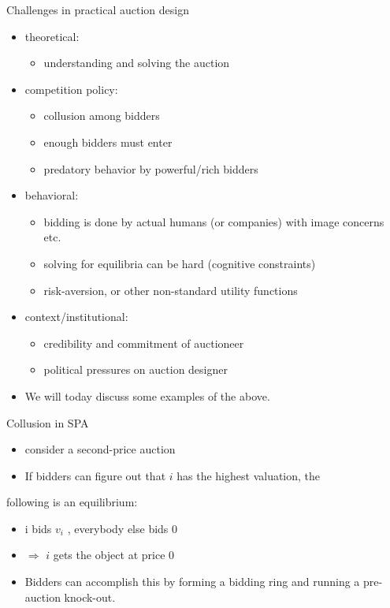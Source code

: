 \documentclass[bigger]{beamer}
\newcommand{\Ra}{\Rightarrow} \newcommand{\ra}{\rightarrow} \newcommand{\Lra}{\Leftrightarrow}
\begin{document}
\begin{frame}[label={sec:org34663bd}]{Challenges in practical auction design}
\begin{itemize}
\item theoretical:
\begin{itemize}
\item understanding and solving the auction
\end{itemize}
\item competition policy:
\begin{itemize}
\item collusion among bidders
\item enough bidders must enter
\item predatory behavior by powerful/rich bidders
\end{itemize}
\item behavioral:
\begin{itemize}
\item bidding is done by actual humans (or companies) with image concerns etc.
\item solving for equilibria can be hard (cognitive constraints)
\item risk-aversion, or other non-standard utility functions
\end{itemize}
\item context/institutional:
\begin{itemize}
\item credibility and commitment of auctioneer
\item political pressures on auction designer
\end{itemize}
\item We will today discuss some examples of the above.
\end{itemize}
\end{frame}

\begin{frame}[label={sec:org204ef57}]{Collusion in SPA}
\begin{itemize}
\item consider a second-price auction
\item If bidders can ﬁgure out that \(i\) has the highest valuation, the
\end{itemize}
following is an equilibrium:
\begin{itemize}
\item i bids \(v_i\) , everybody else bids 0
\item \(\Ra\) \(i\) gets the object at price 0
\end{itemize}
\begin{itemize}
\item Bidders can accomplish this by forming a bidding ring and running a pre-auction knock-out.
\end{itemize}
\end{frame}
\end{document}
